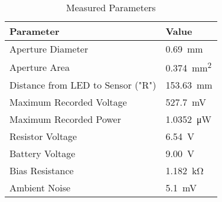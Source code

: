 \begin{table}[!htb]
\caption{Measured Parameters} \label{tab:meas_params}
\bigskip
\centering
\begin{tabular}{l|l}
\rowcolor[HTML]{C0C0C0} 
\textbf{Parameter} & \textbf{Value} \\ \hline
Aperture Diameter & \SI{0.69}{mm} \\
Aperture Area & \SI{0.374}{mm^2} \\
Distance from LED to Sensor ("R") & \SI{153.63}{mm} \\
Maximum Recorded Voltage & \SI{527.7}{mV} \\
Maximum Recorded Power & \SI{1.0352}{\micro\watt} \\
Resistor Voltage & \SI{6.54}{V} \\
Battery Voltage & \SI{9.00}{V} \\
Bias Resistance & \SI{1.182}{\kilo\ohm} \\
Ambient Noise & \SI{5.1}{\milli\volt}
\end{tabular}
\end{table}


